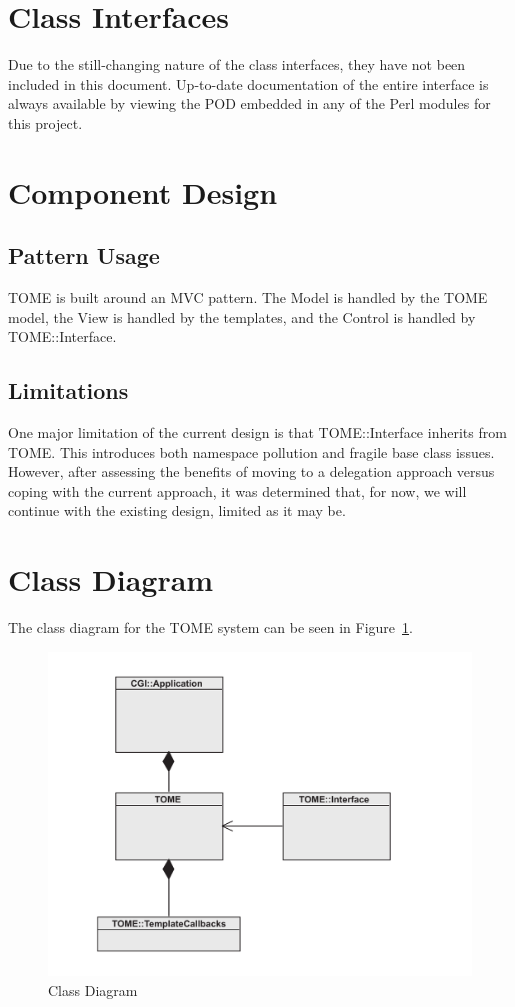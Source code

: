 \documentclass[12pt,titlepage]{article}
\begin{document}
\section{Class Interfaces}
Due to the still-changing nature of the class interfaces, they have not been included in this document.  Up-to-date documentation of the entire interface is always available by viewing the POD embedded in any of the Perl modules for this project.


\section{Component Design}
\subsection{Pattern Usage}
TOME is built around an MVC pattern.  The Model is handled by the TOME model, the View is handled by the templates, and the Control is handled by TOME::Interface.
\subsection{Limitations}
One major limitation of the current design is that TOME::Interface inherits from TOME.  This introduces both namespace pollution and fragile base class issues.  However, after assessing the benefits of moving to a delegation approach versus coping with the current approach, it was determined that, for now, we will continue with the existing design, limited as it may be.


\section{Class Diagram}
The class diagram for the TOME system can be seen in Figure~\ref{ComponentDiagram}.
\begin{figure}[h]
	\includegraphics[width=\textwidth]{ComponentDiagram}
	\caption{Class Diagram}
	\label{ComponentDiagram}
\end{figure}
\end{document}
